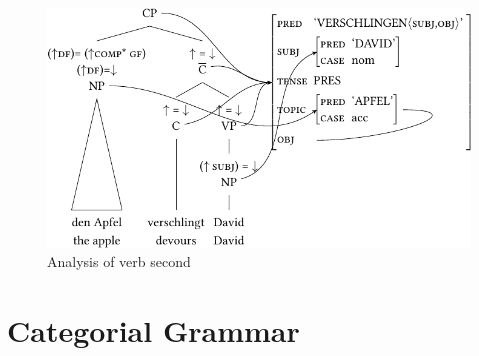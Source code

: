 \begin{enumerate}
\begin{figure}
\centerline{%
\includegraphics{Figures/den-apfel-verschlingt-david-lfg-lsp-crop}
}
\caption{\label{Abbildung-V2-LFG}Analysis of verb second}
\end{figure}%
\end{enumerate}

\pagebreak
\section{Categorial Grammar}

